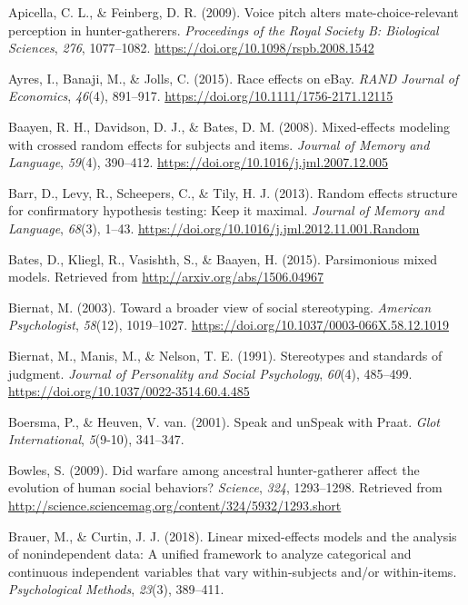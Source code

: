 \documentclass[
  english,
  man]{apa6}
\begin{document}
\hypertarget{refs}{}
\leavevmode\hypertarget{ref-Apicella2009}{}%
Apicella, C. L., \& Feinberg, D. R. (2009). Voice pitch alters mate-choice-relevant perception in hunter-gatherers. \emph{Proceedings of the Royal Society B: Biological Sciences}, \emph{276}, 1077--1082. \url{https://doi.org/10.1098/rspb.2008.1542}

\leavevmode\hypertarget{ref-Ayres2015}{}%
Ayres, I., Banaji, M., \& Jolls, C. (2015). Race effects on eBay. \emph{RAND Journal of Economics}, \emph{46}(4), 891--917. \url{https://doi.org/10.1111/1756-2171.12115}

\leavevmode\hypertarget{ref-Baayen2008}{}%
Baayen, R. H., Davidson, D. J., \& Bates, D. M. (2008). Mixed-effects modeling with crossed random effects for subjects and items. \emph{Journal of Memory and Language}, \emph{59}(4), 390--412. \url{https://doi.org/10.1016/j.jml.2007.12.005}

\leavevmode\hypertarget{ref-Barr2013}{}%
Barr, D., Levy, R., Scheepers, C., \& Tily, H. J. (2013). Random effects structure for confirmatory hypothesis testing: Keep it maximal. \emph{Journal of Memory and Language}, \emph{68}(3), 1--43. \url{https://doi.org/10.1016/j.jml.2012.11.001.Random}

\leavevmode\hypertarget{ref-Bates2015}{}%
Bates, D., Kliegl, R., Vasishth, S., \& Baayen, H. (2015). Parsimonious mixed models. Retrieved from \url{http://arxiv.org/abs/1506.04967}

\leavevmode\hypertarget{ref-Biernat2003}{}%
Biernat, M. (2003). Toward a broader view of social stereotyping. \emph{American Psychologist}, \emph{58}(12), 1019--1027. \url{https://doi.org/10.1037/0003-066X.58.12.1019}

\leavevmode\hypertarget{ref-Biernat1991}{}%
Biernat, M., Manis, M., \& Nelson, T. E. (1991). Stereotypes and standards of judgment. \emph{Journal of Personality and Social Psychology}, \emph{60}(4), 485--499. \url{https://doi.org/10.1037/0022-3514.60.4.485}

\leavevmode\hypertarget{ref-Boersma2001}{}%
Boersma, P., \& Heuven, V. van. (2001). Speak and unSpeak with Praat. \emph{Glot International}, \emph{5}(9-10), 341--347.

\leavevmode\hypertarget{ref-Bowles2009}{}%
Bowles, S. (2009). Did warfare among ancestral hunter-gatherer affect the evolution of human social behaviors? \emph{Science}, \emph{324}, 1293--1298. Retrieved from \url{http://science.sciencemag.org/content/324/5932/1293.short}

\leavevmode\hypertarget{ref-Brauer2018}{}%
Brauer, M., \& Curtin, J. J. (2018). Linear mixed-effects models and the analysis of nonindependent data: A unified framework to analyze categorical and continuous independent variables that vary within-subjects and/or within-items. \emph{Psychological Methods}, \emph{23}(3), 389--411.
\end{document}
